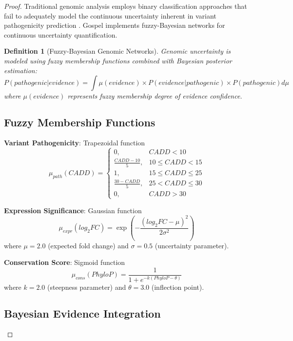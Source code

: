 \documentclass[12pt,a4paper]{article}
\newtheorem{definition}[theorem]{Definition}
\begin{document}
\begin{proof}
Traditional genomic analysis employs binary classification approaches that fail to adequately model the continuous uncertainty inherent in variant pathogenicity prediction \cite{richards2015standards, landrum2018clinvar}. Gospel implements fuzzy-Bayesian networks for continuous uncertainty quantification.

\begin{definition}[Fuzzy-Bayesian Genomic Networks]
Genomic uncertainty is modeled using fuzzy membership functions combined with Bayesian posterior estimation:
\begin{equation}
P(pathogenic|evidence) = \int \mu(evidence) \times P(evidence|pathogenic) \times P(pathogenic) d\mu
\end{equation}
where $\mu(evidence)$ represents fuzzy membership degree of evidence confidence.
\end{definition}

\subsection{Fuzzy Membership Functions}

\textbf{Variant Pathogenicity}: Trapezoidal function
\begin{equation}
\mu_{path}(CADD) = \begin{cases}
0, & CADD < 10 \\
\frac{CADD - 10}{5}, & 10 \leq CADD < 15 \\
1, & 15 \leq CADD \leq 25 \\
\frac{30 - CADD}{5}, & 25 < CADD \leq 30 \\
0, & CADD > 30
\end{cases}
\end{equation}

\textbf{Expression Significance}: Gaussian function
\begin{equation}
\mu_{expr}(log_2FC) = \exp\left(-\frac{(log_2FC - \mu)^2}{2\sigma^2}\right)
\end{equation}
where $\mu = 2.0$ (expected fold change) and $\sigma = 0.5$ (uncertainty parameter).

\textbf{Conservation Score}: Sigmoid function
\begin{equation}
\mu_{cons}(PhyloP) = \frac{1}{1 + e^{-k(PhyloP - \theta)}}
\end{equation}
where $k = 2.0$ (steepness parameter) and $\theta = 3.0$ (inflection point).

\subsection{Bayesian Evidence Integration}


\end{proof}
\end{document}
